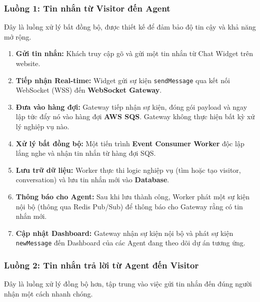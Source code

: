 \subsubsection{Luồng 1: Tin nhắn từ Visitor đến Agent}

Đây là luồng xử lý bất đồng bộ, được thiết kế để đảm bảo độ tin cậy và khả năng mở rộng.

\begin{enumerate}
    \item \textbf{Gửi tin nhắn:} Khách truy cập gõ và gửi một tin nhắn từ Chat Widget trên website.
    \item \textbf{Tiếp nhận Real-time:} Widget gửi sự kiện \texttt{sendMessage} qua kết nối WebSocket (WSS) đến \textbf{WebSocket Gateway}.
    \item \textbf{Đưa vào hàng đợi:} Gateway tiếp nhận sự kiện, đóng gói payload và ngay lập tức đẩy nó vào hàng đợi \textbf{AWS SQS}. Gateway không thực hiện bất kỳ xử lý nghiệp vụ nào.
    \item \textbf{Xử lý bất đồng bộ:} Một tiến trình \textbf{Event Consumer Worker} độc lập lắng nghe và nhận tin nhắn từ hàng đợi SQS.
    \item 
    \begin{sloppypar}
        \textbf{Lưu trữ dữ liệu:} Worker thực thi logic nghiệp vụ (tìm hoặc tạo visitor, conversation) và lưu tin nhắn mới vào \textbf{Database}.
    \end{sloppypar}
    \item \textbf{Thông báo cho Agent:} Sau khi lưu thành công, Worker phát một sự kiện nội bộ (thông qua Redis Pub/Sub) để thông báo cho Gateway rằng có tin nhắn mới.
    \item \textbf{Cập nhật Dashboard:} Gateway nhận sự kiện nội bộ và phát sự kiện \texttt{newMessage} đến Dashboard của các Agent đang theo dõi dự án tương ứng.
\end{enumerate}

\subsubsection{Luồng 2: Tin nhắn trả lời từ Agent đến Visitor}

Đây là luồng xử lý đồng bộ hơn, tập trung vào việc gửi tin nhắn đến đúng người nhận một cách nhanh chóng.


